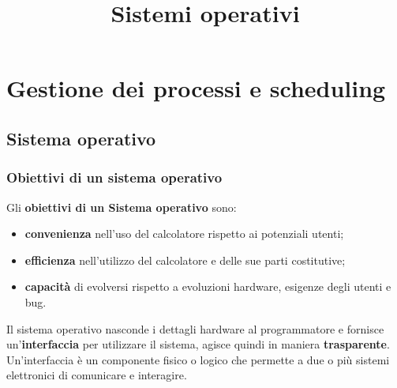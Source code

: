 \documentclass[12pt, letterpaper]{report}
\title{Sistemi operativi}
\date{}
\begin{document}
	{
		\let\cleardoublepage\clearpage
		\maketitle
		\tableofcontents
	}
	\chapter{Gestione dei processi e scheduling}
	\section{Sistema operativo}
	\subsection{Obiettivi di un sistema operativo}
	Gli \textbf{obiettivi di un Sistema operativo} sono:
	\begin{itemize}
		\item \textbf{convenienza} nell'uso del calcolatore rispetto ai potenziali utenti;
		\item \textbf{efficienza} nell'utilizzo del calcolatore e delle sue parti costitutive;
		\item \textbf{capacità} di evolversi rispetto a evoluzioni hardware, esigenze degli utenti e bug.
	\end{itemize}
	Il sistema operativo nasconde i dettagli hardware al programmatore e fornisce un'\textbf{interfaccia} per utilizzare il sistema, agisce quindi in maniera \textbf{trasparente}. Un'interfaccia è un componente fisico o logico che permette a due o più sistemi elettronici di comunicare e interagire.
\end{document}
